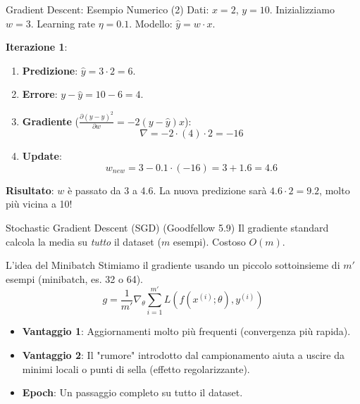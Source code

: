 \documentclass[aspectratio=169, 10pt]{beamer}
\begin{document}
\begin{frame}{Gradient Descent: Esempio Numerico (2)}
    Dati: $x=2$, $y=10$. Inizializziamo $w=3$. Learning rate $\eta=0.1$.
    Modello: $\hat{y} = w \cdot x$.
    
    \textbf{Iterazione 1}:
    \begin{enumerate}
        \item \textbf{Predizione}: $\hat{y} = 3 \cdot 2 = 6$.
        \item \textbf{Errore}: $y - \hat{y} = 10 - 6 = 4$.
        \item \textbf{Gradiente} ($\frac{\partial (y-\hat{y})^2}{\partial w} = -2(y-\hat{y})x$):
        \[ \nabla = -2 \cdot (4) \cdot 2 = -16 \]
        \item \textbf{Update}:
        \[ w_{new} = 3 - 0.1 \cdot (-16) = 3 + 1.6 = 4.6 \]
    \end{enumerate}
    
    \vspace{0.5em}
    \small \textbf{Risultato}: $w$ è passato da 3 a 4.6. La nuova predizione sarà $4.6 \cdot 2 = 9.2$, molto più vicina a 10!
\end{frame}

\begin{frame}{Stochastic Gradient Descent (SGD) (Goodfellow 5.9)}
    Il gradiente standard calcola la media su \emph{tutto} il dataset ($m$ esempi). Costoso $O(m)$.
    
    \begin{block}{L'idea del Minibatch}
        Stimiamo il gradiente usando un piccolo sottoinsieme di $m'$ esempi (minibatch, es. 32 o 64).
        \[ g = \frac{1}{m'} \nabla_\theta \sum_{i=1}^{m'} L(f(x^{(i)}; \theta), y^{(i)}) \]
    \end{block}
    
    \begin{itemize}
        \item \textbf{Vantaggio 1}: Aggiornamenti molto più frequenti (convergenza più rapida).
        \item \textbf{Vantaggio 2}: Il "rumore" introdotto dal campionamento aiuta a uscire da minimi locali o punti di sella (effetto regolarizzante).
        \item \textbf{Epoch}: Un passaggio completo su tutto il dataset.
    \end{itemize}
\end{frame}
\end{document}
